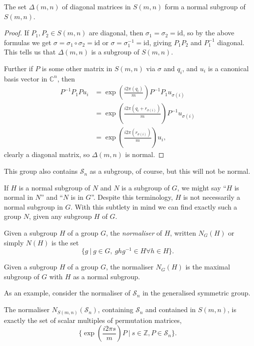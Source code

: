 \begin{prop}
	The set $\Delta(m, n)$ of diagonal matrices in $S(m, n)$ form a normal subgroup of $S(m, n)$.
\end{prop}
\begin{proof}
	If $P_1, P_2 \in S(m, n)$ are diagonal, then $\sigma_1 = \sigma_2 = \text{id}$, so by the above formulas we get $\sigma = \sigma_1\circ \sigma_2 = \text{id}$ or $\sigma = \sigma_1^{-1} = \text{id}$, giving $P_1P_2$ and $P_1^{-1}$ diagonal. This tells us that $\Delta(m, n)$ is a subgroup of $S(m, n)$.
	
	Further if $P$ is some other matrix in $S(m, n)$ via $\sigma$ and $q_i$, and $u_i$ is a canonical basis vector in $\mathbb{C}^n$, then
	\begin{align*}
		P^{-1}P_1Pu_i
		&= \exp\left(\frac{i2\pi\left(q_i\right)}{m}\right)P^{-1}P_1u_{\sigma(i)}
		\\&= \exp\left(\frac{i2\pi\left(q_i+r_{\sigma(i)}\right)}{m}\right)P^{-1}u_{\sigma(i)}
		\\&= \exp\left(\frac{i2\pi\left(r_{\sigma(i)}\right)}{m}\right)u_i,
	\end{align*}
clearly a diagonal matrix, so $\Delta(m, n)$ is normal.
\end{proof}

This group also contains $\mathcal{S}_n$ as a subgroup, of course, but this will not be normal.

If $H$ is a normal subgroup of $N$ and $N$ is a subgroup of $G$, we might say ``$H$ is normal in $N$'' and ``$N$ is in $G$''. Despite this terminology, $H$ is not necessarily a normal subgroup in $G$. With this subtlety in mind we can find exactly such a group $N$, given any subgroup $H$ of $G$.
\begin{define}
Given a subgroup $H$ of a group $G$, the \emph{normaliser} of $H$, written $N_G(H)$ or simply $N(H)$ is the set
\[\{g\ |\ g \in G,\ ghg^{-1} \in H \forall h \in H\}.\]
\end{define}
\begin{prop}
	Given a subgroup $H$ of a group $G$, the normaliser $N_G(H)$ is the maximal subgroup of $G$ with $H$ as a normal subgroup.
\end{prop}

As an example, consider the normaliser of $\mathcal{S}_n$ in the generalised symmetric group.

\begin{prop}
	The normaliser $N_{S(m, n)}(\mathcal{S}_n)$, containing $\mathcal{S}_n$ and contained in $S(m, n)$, is exactly the set of scalar multiples of permutation matrices, \[\{\exp\left(\frac{i2\pi s}{m}\right)P\ |\ s \in \mathbb{Z}, P \in \mathcal{S}_n\}.\]
\end{prop}

